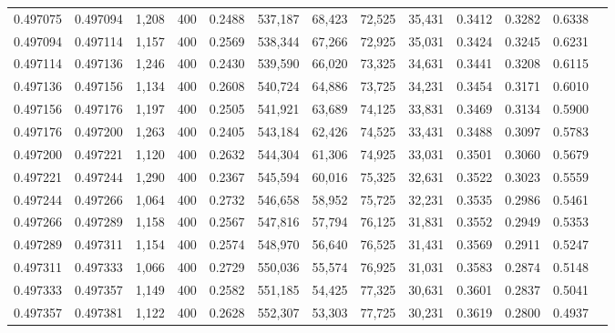 \begin{tabular}{rrrrrrrrrrrrr}
0.497075 & 0.497094 &  1,208 & 400 &                                     0.2488 & 537,187 &  68,423 &  72,525 &  35,431 & 0.3412 & 0.3282 & 0.6338 \\
0.497094 & 0.497114 &  1,157 & 400 &                                     0.2569 & 538,344 &  67,266 &  72,925 &  35,031 & 0.3424 & 0.3245 & 0.6231 \\
0.497114 & 0.497136 &  1,246 & 400 &                                     0.2430 & 539,590 &  66,020 &  73,325 &  34,631 & 0.3441 & 0.3208 & 0.6115 \\
0.497136 & 0.497156 &  1,134 & 400 &                                     0.2608 & 540,724 &  64,886 &  73,725 &  34,231 & 0.3454 & 0.3171 & 0.6010 \\
0.497156 & 0.497176 &  1,197 & 400 &                                     0.2505 & 541,921 &  63,689 &  74,125 &  33,831 & 0.3469 & 0.3134 & 0.5900 \\
0.497176 & 0.497200 &  1,263 & 400 &                                     0.2405 & 543,184 &  62,426 &  74,525 &  33,431 & 0.3488 & 0.3097 & 0.5783 \\
0.497200 & 0.497221 &  1,120 & 400 &                                     0.2632 & 544,304 &  61,306 &  74,925 &  33,031 & 0.3501 & 0.3060 & 0.5679 \\
0.497221 & 0.497244 &  1,290 & 400 &                                     0.2367 & 545,594 &  60,016 &  75,325 &  32,631 & 0.3522 & 0.3023 & 0.5559 \\
0.497244 & 0.497266 &  1,064 & 400 &                                     0.2732 & 546,658 &  58,952 &  75,725 &  32,231 & 0.3535 & 0.2986 & 0.5461 \\
0.497266 & 0.497289 &  1,158 & 400 &                                     0.2567 & 547,816 &  57,794 &  76,125 &  31,831 & 0.3552 & 0.2949 & 0.5353 \\
0.497289 & 0.497311 &  1,154 & 400 &                                     0.2574 & 548,970 &  56,640 &  76,525 &  31,431 & 0.3569 & 0.2911 & 0.5247 \\
0.497311 & 0.497333 &  1,066 & 400 &                                     0.2729 & 550,036 &  55,574 &  76,925 &  31,031 & 0.3583 & 0.2874 & 0.5148 \\
0.497333 & 0.497357 &  1,149 & 400 &                                     0.2582 & 551,185 &  54,425 &  77,325 &  30,631 & 0.3601 & 0.2837 & 0.5041 \\
0.497357 & 0.497381 &  1,122 & 400 &                                     0.2628 & 552,307 &  53,303 &  77,725 &  30,231 & 0.3619 & 0.2800 & 0.4937 \\

\end{tabular}
